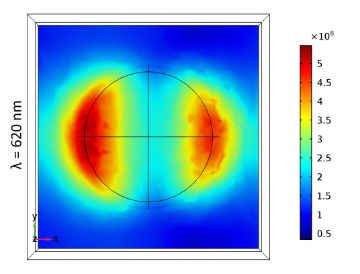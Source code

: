 \begin{figure}[htb!]
\begin{subfigure}{0.32\textwidth}
        \includegraphics[width=\linewidth]{figures/ch4/S5A/FieldDistribution/LSPR/Sample5A_TM_Slice@z=-05t_wl=620_notitle.png}
   \end{subfigure}
   

\end{figure}

